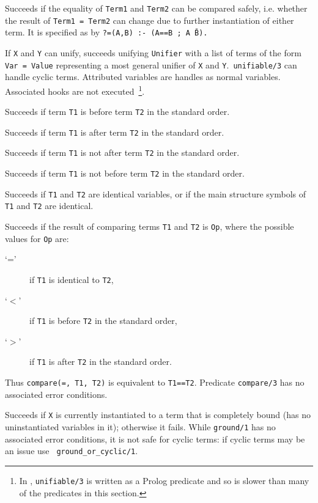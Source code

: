 \begin{description}
%
Succeeds if the equality of {\tt Term1} and {\tt Term2} can be
compared safely, i.e. whether the result of {\tt Term1 = Term2} can
change due to further instantiation of either term. It is specified as
by {\tt ?=(A,B) :- (A==B ; A \= B).} 

%
If {\tt X} and {\tt Y} can unify, succeeds unifying {\tt Unifier} with
a list of terms of the form {\tt Var = Value} representing a most
general unifier of {\tt X} and {\tt Y}.\  {\tt unifiable/3} can handle
cyclic terms. Attributed variables are handles as normal
variables. Associated hooks are not executed~\footnote{In \version ,
  {\tt unifiable/3} is written as a Prolog predicate and so is slower
  than many of the predicates in this section.}.

    Succeeds if term {\tt T1} is before term {\tt T2} in the standard order.

    Succeeds if term {\tt T1} is after term {\tt T2} in the standard order.

    Succeeds if term {\tt T1} is not after term {\tt T2} in the standard order.

    Succeeds if term {\tt T1} is not before term {\tt T2} in the standard order.

    Succeeds if {\tt T1} and {\tt T2} are identical variables, or if
    the main structure symbols of {\tt T1} and {\tt T2} are identical.

    Succeeds if the result of comparing terms {\tt T1} and {\tt T2} 
    is {\tt Op}, where the possible values for {\tt Op} are:
    \begin{description}
    \item[`='] if {\tt T1} is identical to {\tt T2},
    \item[`$<$'] if {\tt T1} is before {\tt T2} in the standard order,
    \item[`$>$'] if {\tt T1} is after {\tt T2} in the standard order.
    \end{description}
    Thus {\tt compare(=, T1, T2)} is equivalent to {\tt T1==T2}.
    Predicate {\tt compare/3} has no associated error conditions.

%
Succeeds if {\tt X} is currently instantiated to a term that is
completely bound (has no uninstantiated variables in it); otherwise it
fails.  While {\tt ground/1} has no associated error conditions, it is
not safe for cyclic terms: if cyclic terms may be an issue use {\tt
  ground\_or\_cyclic/1}.


\end{description}
